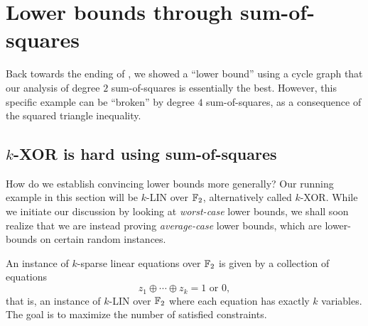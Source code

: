
\clearpage

\section{Lower bounds through sum-of-squares}
\label{sec:lower-bounds}

Back towards the ending of , we showed a ``lower bound'' using a cycle graph that our analysis of degree $2$ sum-of-squares is essentially the best. However, this specific example can be ``broken'' by degree $4$ sum-of-squares, as a consequence of the squared triangle inequality.

\subsection{$k$-XOR is hard using sum-of-squares}

	How do we establish convincing lower bounds more generally? Our running example in this section will be $k$-LIN over $\mathbb{F}_2$, alternatively called $k$-XOR. While we initiate our discussion by looking at \emph{worst-case} lower bounds, we shall soon realize that we are instead proving \emph{average-case} lower bounds, which are lower-bounds on certain random instances.

	\begin{fdef}
		An instance of $k$-sparse linear equations over $\mathbb{F}_2$ is given by a collection of equations
		\[ z_1 \oplus \cdots \oplus z_k = 1 \text{ or } 0, \]
		that is, an instance of $k$-LIN over $\mathbb{F}_2$ where each equation has exactly $k$ variables. The goal is to maximize the number of satisfied constraints.
	\end{fdef}

